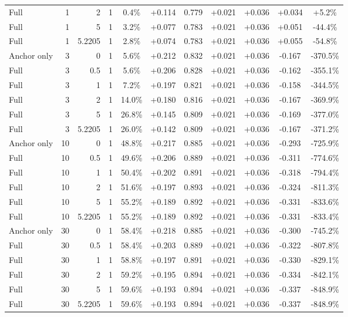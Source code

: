\begin{table}[htbp]
\begin{tabular}{lrrrccccccc}
Full & 1 & 2 & 1 & 0.4\% & +0.114 & 0.779 & +0.021 & +0.036 & +0.034 & +5.2\% \\
Full & 1 & 5 & 1 & 3.2\% & +0.077 & 0.783 & +0.021 & +0.036 & +0.051 & -44.4\% \\
Full & 1 & 5.2205 & 1 & 2.8\% & +0.074 & 0.783 & +0.021 & +0.036 & +0.055 & -54.8\% \\
Anchor only & 3 & 0 & 1 & 5.6\% & +0.212 & 0.832 & +0.021 & +0.036 & -0.167 & -370.5\% \\
Full & 3 & 0.5 & 1 & 5.6\% & +0.206 & 0.828 & +0.021 & +0.036 & -0.162 & -355.1\% \\
Full & 3 & 1 & 1 & 7.2\% & +0.197 & 0.821 & +0.021 & +0.036 & -0.158 & -344.5\% \\
Full & 3 & 2 & 1 & 14.0\% & +0.180 & 0.816 & +0.021 & +0.036 & -0.167 & -369.9\% \\
Full & 3 & 5 & 1 & 26.8\% & +0.145 & 0.809 & +0.021 & +0.036 & -0.169 & -377.0\% \\
Full & 3 & 5.2205 & 1 & 26.0\% & +0.142 & 0.809 & +0.021 & +0.036 & -0.167 & -371.2\% \\
Anchor only & 10 & 0 & 1 & 48.8\% & +0.217 & 0.885 & +0.021 & +0.036 & -0.293 & -725.9\% \\
Full & 10 & 0.5 & 1 & 49.6\% & +0.206 & 0.889 & +0.021 & +0.036 & -0.311 & -774.6\% \\
Full & 10 & 1 & 1 & 50.4\% & +0.202 & 0.891 & +0.021 & +0.036 & -0.318 & -794.4\% \\
Full & 10 & 2 & 1 & 51.6\% & +0.197 & 0.893 & +0.021 & +0.036 & -0.324 & -811.3\% \\
Full & 10 & 5 & 1 & 55.2\% & +0.189 & 0.892 & +0.021 & +0.036 & -0.331 & -833.6\% \\
Full & 10 & 5.2205 & 1 & 55.2\% & +0.189 & 0.892 & +0.021 & +0.036 & -0.331 & -833.4\% \\
Anchor only & 30 & 0 & 1 & 58.4\% & +0.218 & 0.885 & +0.021 & +0.036 & -0.300 & -745.2\% \\
Full & 30 & 0.5 & 1 & 58.4\% & +0.203 & 0.889 & +0.021 & +0.036 & -0.322 & -807.8\% \\
Full & 30 & 1 & 1 & 58.8\% & +0.197 & 0.891 & +0.021 & +0.036 & -0.330 & -829.1\% \\
Full & 30 & 2 & 1 & 59.2\% & +0.195 & 0.894 & +0.021 & +0.036 & -0.334 & -842.1\% \\
Full & 30 & 5 & 1 & 59.6\% & +0.193 & 0.894 & +0.021 & +0.036 & -0.337 & -848.9\% \\
Full & 30 & 5.2205 & 1 & 59.6\% & +0.193 & 0.894 & +0.021 & +0.036 & -0.337 & -848.9\% \\

\end{tabular}
\end{table}
